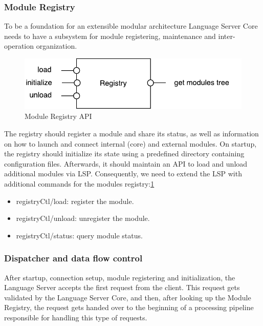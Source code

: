 \subsubsection{Module Registry}
\label{sec:met:arch:core:module_registry}

To be a foundation for an extensible modular architecture Language Server Core needs to have a subsystem
for module registering, maintenance and inter-operation organization.

\begin{figure}[H]
    \centering
    \includegraphics[width=.7\textwidth]{figs/registry.pdf}
    \caption{Module Registry API}
    \label{fig:met:registry_methods}
\end{figure}

\newpage
The registry should register a module and share its status, as well as information on how to launch and connect
internal (core) and external modules. On startup, the registry should initialize its state using a predefined directory
containing configuration files. Afterwards, it should maintain an API to load and unload additional modules via LSP.
Consequently, we need to extend the LSP with additional commands for the modules registry:\ref{fig:met:registry_methods}

\begin{itemize}
    \item registryCtl/load: register the module.
    \item registryCtl/unload: unregister the module.
    \item registryCtl/status: query module status.
\end{itemize}

\subsubsection{Dispatcher and data flow control}
\label{sec:met:arch:core:dispatcher}

After startup, connection setup, module registering and initialization,
the Language Server accepts the first request from the client.
This request gets validated by the Language Server Core, and then, after looking up the Module Registry, the request
gets handed over to the beginning of a processing pipeline responsible for handling this type of requests.

